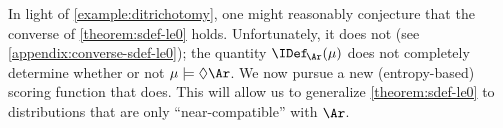 %
In light of \cref{example:ditrichotomy}, one might reasonably conjecture that the converse of \cref{theorem:sdef-le0} holds.
Unfortunately, it does not (see \cref{appendix:converse-sdef-le0});
the quantity $\IDef_{\!\Ar}(\mu)$ does not 
completely determine whether or not 
$\mu \models \Diamond \Ar$. We now pursue a new (entropy-based) scoring function that does.
This will allow us to generalize \cref{theorem:sdef-le0} to distributions that are only ``near-compatible'' with $\Ar$. 

